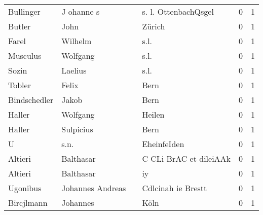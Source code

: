 \documentclass[10pt,a4paper,landscape]{article}
\begin{document}
\begin{longtable}{llllrr}
                Bullinger &                         J ohanne s &             &                        s. l. OttenbachQsgel &          0 &         1 \\
                   Butler &                               John &             &                                      Zürich &          0 &         1 \\
                    Farel &                            Wilhelm &             &                                        s.l. &          0 &         1 \\
                 Musculus &                           Wolfgang &             &                                        s.l. &          0 &         1 \\
                    Sozin &                            Laelius &             &                                        s.l. &          0 &         1 \\
                   Tobler &                              Felix &             &                                        Bern &          0 &         1 \\
             Bindschedler &                              Jakob &             &                                        Bern &          0 &         1 \\
                   Haller &                           Wolfgang &             &                                      Heilen &          0 &         1 \\
                   Haller &                          Sulpicius &             &                                        Bern &          0 &         1 \\
                        U &                               s.n. &             &                                 EheinfeIden &          0 &         1 \\
                  Altieri &                          Balthasar &             &                      C CLi BrAC et dileiAAk &          0 &         1 \\
                  Altieri &                          Balthasar &             &                                          iy &          0 &         1 \\
                 Ugonibus &                   Johannes Andreas &             &                          Cdlcinah ie Brestt &          0 &         1 \\
               Bircjlmann &                           Johannes &             &                                        Köln &          0 &         1 \\

\end{longtable}
\end{document}
